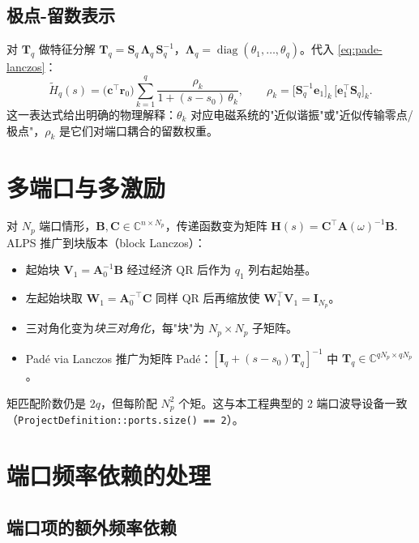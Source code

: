 \documentclass[11pt,a4paper]{ctexart}
\newcommand{\C}{\mathbb{C}}
\DeclareMathOperator{\diag}{diag}
\begin{document}
\subsection{极点-留数表示}

对 $\bm T_q$ 做特征分解 $\bm T_q = \bm S_q\,\bm \Lambda_q\,\bm S_q^{-1}$，$\bm\Lambda_q = \diag(\theta_1,\dots,\theta_q)$。代入 \eqref{eq:pade-lanczos}：
\begin{equation}
  \widetilde H_q(s)
  = \big(\bm c^{\!\top}\bm r_0\big)\sum_{k=1}^{q}\frac{\rho_k}{1+(s-s_0)\,\theta_k},\qquad
  \rho_k = \big[\bm S_q^{-1}\bm e_1\big]_k\,\big[\bm e_1^{\!\top}\bm S_q\big]_k.
  \label{eq:pole-residue}
\end{equation}
这一表达式给出明确的物理解释：$\theta_k$ 对应电磁系统的"近似谐振"或"近似传输零点/极点"，$\rho_k$ 是它们对端口耦合的留数权重。

\section{多端口与多激励}

对 $N_p$ 端口情形，$\bm B,\bm C\in\C^{n\times N_p}$，传递函数变为矩阵
\(
  \bm H(s) = \bm C^{\!\top}\bm A(\omega)^{-1}\bm B.
\)
ALPS 推广到块版本（block Lanczos）：
\begin{itemize}
\item 起始块 $\bm V_1 = \bm A_0^{-1}\bm B$ 经过经济 QR 后作为 $q_1$ 列右起始基。
\item 左起始块取 $\bm W_1 = \bm A_0^{-\top}\bm C$ 同样 QR 后再缩放使 $\bm W_1^{\!\top}\bm V_1 = \bm I_{N_p}$。
\item 三对角化变为\emph{块三对角化}，每"块"为 $N_p\times N_p$ 子矩阵。
\item Padé via Lanczos 推广为矩阵 Padé：$[\bm I_q + (s-s_0)\bm T_q]^{-1}$ 中 $\bm T_q\in\C^{qN_p\times qN_p}$。
\end{itemize}
矩匹配阶数仍是 $2q$，但每阶配 $N_p^2$ 个矩。这与本工程典型的 2 端口波导设备一致（\texttt{ProjectDefinition::ports.size() == 2}）。

\section{端口频率依赖的处理}

\subsection{端口项的额外频率依赖}
\end{document}
